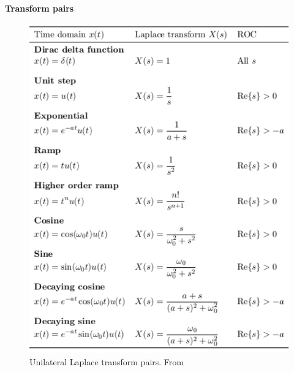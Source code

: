 \textbf{Transform pairs}
\begin{figure}[H]
    \centering
    \includegraphics[width=12cm]{image/unilateral-Laplace-transform-pairs.pdf}
    \caption{Unilateral Laplace transform pairs. From \cite{}}
\end{figure}

